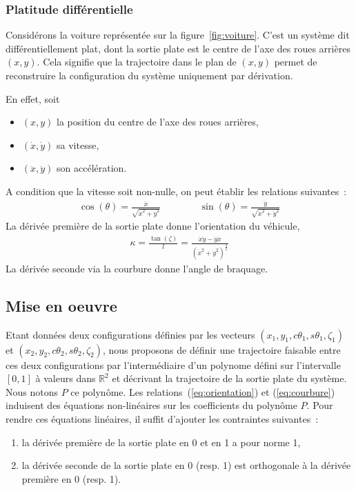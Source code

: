 \documentclass {article}
\newcommand\dx{\dot{x}}
\newcommand\dy{\dot{y}}
\newcommand\ddx{\ddot{x}}
\newcommand\ddy{\ddot{y}}
\def\real{{\mathbb R}}
\begin{document}
\subsubsection* {Platitude différentielle}

Considérons la voiture représentée sur la figure~\ref{fig:voiture}. C'est un système dit différentiellement plat, dont la sortie plate est le centre de l'axe des roues arrières $(x,y)$. Cela signifie que la trajectoire dans le plan de $(x,y)$ permet de reconstruire la configuration du système uniquement par dérivation.

En effet, soit
\begin {itemize}
  \item $(x,y)$ la position du centre de l'axe des roues arrières,
  \item $(\dx, \dy)$ sa vitesse,
  \item $(\ddx, \ddy)$ son accélération.
\end {itemize}
A condition que la vitesse soit non-nulle, on peut établir les relations suivantes~:
\begin {align}\label{eq:orientation}
  \cos(\theta) = \frac{\dx}{\sqrt{\dx^2+\dy^2}} & \hspace {1cm} & \sin(\theta) = \frac{\dy}{\sqrt{\dx^2+\dy^2}}
\end {align}
La dérivée première de la sortie plate donne l'orientation du véhicule,
\begin{align}\label{eq:courbure}
  \kappa = \frac{\tan (\zeta)}{l} = \frac{\dx\ddy - \dy\ddx}{(\dx^2+\dy^2)^{\frac{3}{2}}}
\end{align}
La dérivée seconde via la courbure donne l'angle de braquage.

\subsection* {Mise en oeuvre}

Etant données deux configurations définies par les vecteurs $(x_1,y_1,c\theta_1,s\theta_1,\zeta_1)$ et $(x_2,y_2,c\theta_2,s\theta_2,\zeta_2)$, nous proposons de définir une trajectoire faisable entre ces deux configurations par l'intermédiaire d'un polynome défini sur l'intervalle $[0,1]$ à valeurs dans $\real^2$ et décrivant la trajectoire de la sortie plate du système. Nous notons $P$ ce polyn\^ome. Les relations~(\ref{eq:orientation}) et (\ref{eq:courbure}) induisent des équations non-linéaires sur les coefficients du polyn\^ome $P$. Pour rendre ces équations linéaires, il suffit d'ajouter les contraintes suivantes~:
\begin{enumerate}
\item la dérivée première de la sortie plate en 0 et en 1 a pour norme 1,
\item la dérivée seconde de la sortie plate en 0 (resp. 1) est orthogonale à la dérivée première en 0 (resp. 1).
\end{enumerate}
\end{document}
